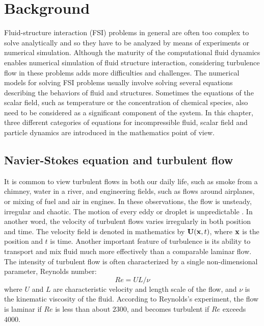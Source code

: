 \chapter{Background}\label{background}
Fluid-structure interaction (FSI) problems in general are often too complex to solve analytically and so they have to be analyzed by means of experiments or numerical simulation. Although the maturity of the computational fluid dynamics enables numerical simulation of fluid structure interaction, considering turbulence flow in these problems adds more difficulties and challenges. The numerical models for solving FSI problems usually involve solving several equations describing the behaviors of fluid and structures. Sometimes the equations of the scalar field, such as temperature or the concentration of chemical species, also need to be considered as a significant component of the system. In this chapter, three different categories of equations for incompressible fluid, scalar field and particle dynamics are introduced in the mathematics point of view.

\section{Navier-Stokes equation and turbulent flow}
It is common to view turbulent flows in both our daily life, such as smoke from a chimney, water in a river, and engineering fields, such as flows around airplanes, or mixing of fuel and air in engines. In these observations, the flow is unsteady, irregular and chaotic. The motion of every eddy or droplet is unpredictable \cite{PopeTurbulent2000}. In another word, the velocity of turbulent flows varies irregularly in both position and time. The velocity field is denoted in mathematics by $\mathbf{U}(\mathbf{x},t)$, where $\mathbf{x}$ is the position and $t$ is time. Another important feature of turbulence is its ability to transport and mix fluid much more effectively than a comparable laminar flow. The intensity of turbulent flow is often characterized by a single non-dimensional parameter, Reynolds number\cite{Reynolds1894}: 
\begin{equation}
Re = U L / \nu
\label{ReynoldsNumber}
\end{equation}
where $U$ and $L$ are characteristic velocity and length scale of the flow, and $\nu$ is the kinematic viscosity of the fluid. According to Reynolds's experiment, the flow is laminar if $Re$ is less than about $2300$, and becomes turbulent if $Re$ exceeds $4000$.

